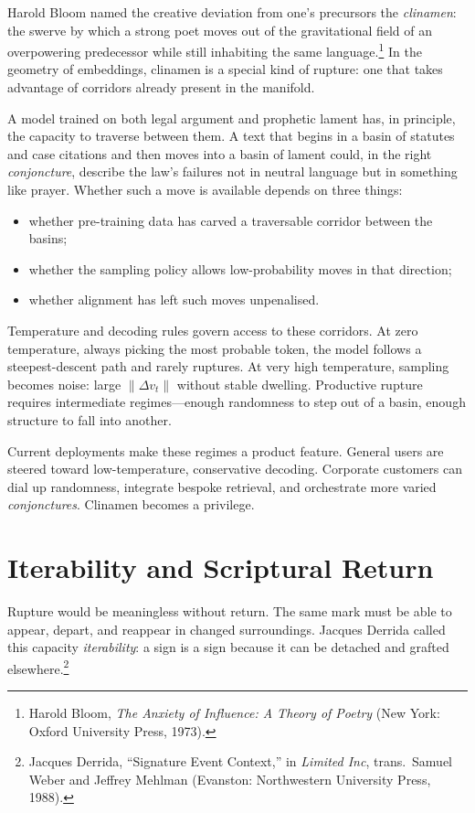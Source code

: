 \documentclass[12pt,a4paper]{article}
\begin{document}
Harold Bloom named the creative deviation from one's precursors the \emph{clinamen}: the swerve by which a strong poet moves out of the gravitational field of an overpowering predecessor while still inhabiting the same language.\footnote{Harold Bloom, \emph{The Anxiety of Influence: A Theory of Poetry} (New York: Oxford University Press, 1973).} In the geometry of embeddings, clinamen is a special kind of rupture: one that takes advantage of corridors already present in the manifold.

A model trained on both legal argument and prophetic lament has, in principle, the capacity to traverse between them. A text that begins in a basin of statutes and case citations and then moves into a basin of lament could, in the right \emph{conjoncture}, describe the law's failures not in neutral language but in something like prayer. Whether such a move is available depends on three things:

\begin{itemize}
\item whether pre-training data has carved a traversable corridor between the basins;
\item whether the sampling policy allows low-probability moves in that direction;
\item whether alignment has left such moves unpenalised.
\end{itemize}

Temperature and decoding rules govern access to these corridors. At zero temperature, always picking the most probable token, the model follows a steepest-descent path and rarely ruptures. At very high temperature, sampling becomes noise: large $\|\Delta v_t\|$ without stable dwelling. Productive rupture requires intermediate regimes---enough randomness to step out of a basin, enough structure to fall into another.

Current deployments make these regimes a product feature. General users are steered toward low-temperature, conservative decoding. Corporate customers can dial up randomness, integrate bespoke retrieval, and orchestrate more varied \emph{conjonctures}. Clinamen becomes a privilege.

\section{Iterability and Scriptural Return}

Rupture would be meaningless without return. The same mark must be able to appear, depart, and reappear in changed surroundings. Jacques Derrida called this capacity \emph{iterability}: a sign is a sign because it can be detached and grafted elsewhere.\footnote{Jacques Derrida, ``Signature Event Context,'' in \emph{Limited Inc}, trans.\ Samuel Weber and Jeffrey Mehlman (Evanston: Northwestern University Press, 1988).}
\end{document}
